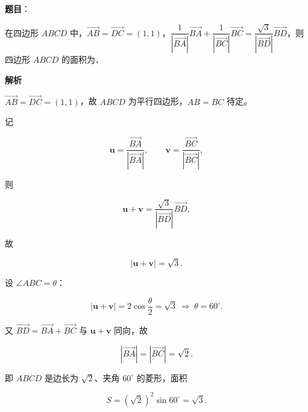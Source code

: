 \begin{answer}

\textbf{题目}：

在四边形 $ABCD$ 中，$\overrightarrow{AB}=\overrightarrow{DC}=(1,1)$，$\dfrac{1}{|\overrightarrow{BA}|}\overrightarrow{BA}+\dfrac{1}{|\overrightarrow{BC}|}\overrightarrow{BC}=\dfrac{\sqrt3}{|\overrightarrow{BD}|}\overrightarrow{BD}$，则四边形 $ABCD$ 的面积为\gkblank{}．

\textbf{解析}

$\overrightarrow{AB}=\overrightarrow{DC}=(1,1)$，故 $ABCD$ 为平行四边形，$AB=BC$ 待定。

记

\nopagebreak[4]
\[\boldsymbol u=\frac{\overrightarrow{BA}}{|\overrightarrow{BA}|},\qquad
\boldsymbol v=\frac{\overrightarrow{BC}}{|\overrightarrow{BC}|},\]

则

\nopagebreak[4]
\[\boldsymbol u+\boldsymbol v=\frac{\sqrt3}{|\overrightarrow{BD}|}\overrightarrow{BD},\]

故

\nopagebreak[4]
\[|\boldsymbol u+\boldsymbol v|=\sqrt3 .\]

设 $\angle ABC=\theta$：

\nopagebreak[4]
\[|\boldsymbol u+\boldsymbol v|=2\cos\frac\theta2=\sqrt3
\ \Longrightarrow\ \theta=60^\circ .\]

又 $\overrightarrow{BD}=\overrightarrow{BA}+\overrightarrow{BC}$ 与 $\boldsymbol u+\boldsymbol v$ 同向，故

\nopagebreak[4]
\[|\overrightarrow{BA}|=|\overrightarrow{BC}|=\sqrt2 .\]

即 $ABCD$ 是边长为 $\sqrt2$、夹角 $60^\circ$ 的菱形，面积

\nopagebreak[4]
\[S=(\sqrt2)^2\sin60^\circ=\sqrt3 .\]


\end{answer}
